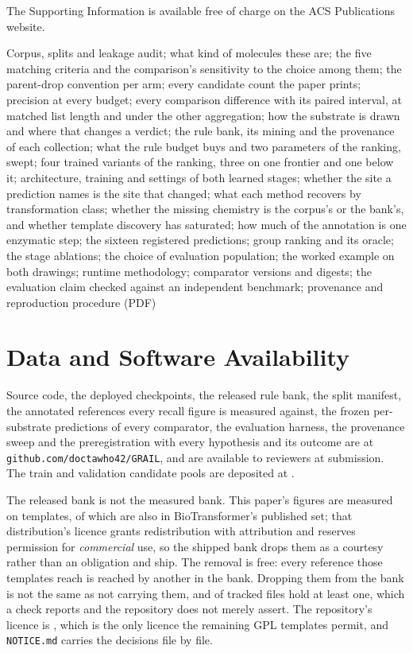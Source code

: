 \begin{suppinfo}

The Supporting Information is available free of charge on the ACS Publications website.

Corpus, splits and leakage audit; what kind of molecules these are; the five matching criteria and the comparison's sensitivity to
the choice among them; the parent-drop convention per arm; every candidate count the paper prints;
precision at every budget; every comparison difference with its paired interval, at matched list
length and under the other aggregation; how the substrate is drawn and where that changes a
verdict; the rule bank, its mining and the provenance of each collection; what the rule budget
buys and two parameters of the ranking, swept; four trained variants of the ranking, three on one
frontier and one below it; architecture, training and settings of both learned
stages; whether the site a prediction names is the site that changed; what each method recovers by
transformation class; whether the missing chemistry is the corpus's or the bank's, and whether
template discovery has saturated; how much of the annotation is one enzymatic step; the sixteen
registered predictions; group ranking and its oracle; the stage ablations; the choice of evaluation
population; the worked example on both drawings; runtime methodology; comparator versions and
digests; the evaluation claim checked against an independent benchmark; provenance and reproduction
procedure (PDF)

\end{suppinfo}

\section{Data and Software Availability}

Source code, the deployed checkpoints, the released rule bank, the split manifest, the annotated
references every recall figure is measured against, the frozen per-substrate predictions of every
comparator, the evaluation harness, the provenance sweep and the preregistration with every
hypothesis and its outcome are at \texttt{github.com/doctawho42/GRAIL}, and are available to
reviewers at submission. The train and validation candidate pools are deposited at \ZenodoDoi{}.

The released bank is not the measured bank. This paper's figures are measured on
\numRelbankMeasured{} templates, of which \numRelbankRemoved{} are also in BioTransformer's
published set; that distribution's licence grants redistribution with attribution and reserves
permission for \emph{commercial} use, so the shipped bank drops them as a courtesy rather than an
obligation and \numRelbankReleased{} ship. The removal is free: every reference those templates
reach is reached by another in the bank. Dropping them from the bank is not the same as not
carrying them, and of \numRelbankCarrierscanned{} tracked files \numRelbankCarriersWord{} hold at
least one, which a check reports and the repository does not merely assert. The repository's
licence is \RepoLicence{}, which is the only licence the remaining GPL templates permit, and \texttt{NOTICE.md} carries the decisions file by file.

